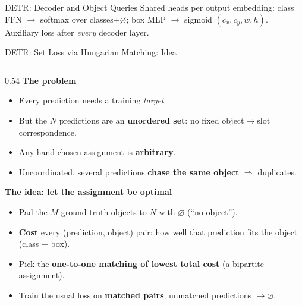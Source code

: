 \begin{frame}[fragile]{DETR: Decoder and Object Queries}
  \vspace{0.2em}
  {\footnotesize Shared heads per output embedding: class FFN $\to$ softmax over classes${+}\varnothing$; box MLP $\to$ sigmoid $(c_x,c_y,w,h)$. Auxiliary loss after \emph{every} decoder layer.}
\end{frame}

\begin{frame}{DETR: Set Loss via Hungarian Matching: Idea}

  \begin{columns}[T]
    \begin{column}{0.54\textwidth}
      \textbf{The problem}
      \begin{itemize}
        \item Every prediction needs a training \emph{target}.
        \item But the $N$ predictions are an \textbf{unordered set}: no fixed object$\to$slot correspondence.
        \item Any hand-chosen assignment is \textbf{arbitrary}.
        \item Uncoordinated, several predictions \textbf{chase the same object} $\Rightarrow$ duplicates.
      \end{itemize}

      \vspace{0.4em}
      \textbf{The idea: let the assignment be optimal}
      \begin{itemize}
        \item Pad the $M$ ground-truth objects to $N$ with $\varnothing$ (``no object'').
        \item \textbf{Cost} every (prediction, object) pair: how well that prediction fits the object (class $+$ box).
        \item Pick the \textbf{one-to-one matching of lowest total cost} (a bipartite assignment).
        \item Train the usual loss on \textbf{matched pairs}; unmatched predictions $\to \varnothing$.
      \end{itemize}


\end{column}
\end{columns}
\end{frame}
